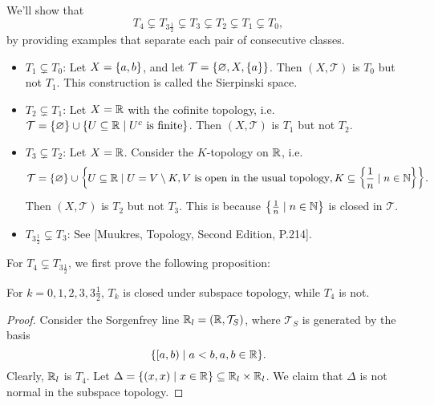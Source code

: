 \begin{ex}
    We'll show that
    \[
    T_4 \subsetneq T_{3\frac 1 2} \subsetneq T_3 \subsetneq T_2 \subsetneq T_1 \subsetneq T_0,
    \]
    by providing examples that separate each pair of consecutive classes.
    \begin{itemize}
        \item $T_1 \subsetneq T_0$: Let $X = {\left\{{a, b}\right\}}$, and let $\mathcal T = {\left\{{\varnothing, X, {\left\{{a}\right\}}}\right\}}$. Then $(X, \mathcal T)$ is $T_0$ but not $T_1$. This construction is called the Sierpinski space.
        \item $T_2 \subsetneq T_1$: Let $X = {\mathbb R}$ with the cofinite topology, i.e. $\mathcal T = {\left\{{\varnothing}\right\}} \cup {\left\{{U\subseteq {\mathbb R}\mid U^c \text{ is finite}}\right\}}$. Then $(X, \mathcal T)$ is $T_1$ but not $T_2$.
        \item $T_3 \subsetneq T_2$: Let $X = {\mathbb R}$. Consider the $K$-topology on ${\mathbb R}$, i.e. 
        \[
        \mathcal T = {\left\{{\varnothing}\right\}} \cup {\left\{{U\subseteq {\mathbb R}\mid U = V\setminus K, V \text{ is open in the usual topology}, K\subseteq {\left\{{\frac1n \mid n\in {\mathbb N}}\right\}}}\right\}}.
        \]
        Then $(X, \mathcal T)$ is $T_2$ but not $T_3$. This is because ${\left\{{\frac1n \mid n\in {\mathbb N}}\right\}}$ is closed in $\mathcal T$.
        \item $T_{3\frac12} \subsetneq T_3$: See [Muukres, Topology, Second Edition, P.214].
    \end{itemize}
    For $T_4 \subsetneq T_{3\frac 1 2}$, we first prove the following proposition:
    \begin{prop}
        For $k = 0, 1, 2, 3, 3\frac12$, $T_k$ is closed under subspace topology, while $T_4$ is not.
        \begin{proof}
            Consider the Sorgenfrey line ${\mathbb R}_l = ({\mathbb R}, \mathcal T_S)$, where $\mathcal T_S$ is generated by the basis
            \[
            {\left\{{[a, b) \mid a < b, a, b\in {\mathbb R}}\right\}}.
            \]
            Clearly, ${\mathbb R}_l$ is $T_4$. Let $\Delta = {\left\{{(x, x) \mid x\in {\mathbb R}}\right\}} \subseteq {\mathbb R}_l \times {\mathbb R}_l$. We claim that $\Delta$ is not normal in the subspace topology.
        \end{proof}
    \end{prop}
\end{ex}